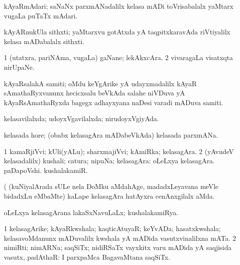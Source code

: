 \begin{center}
\bentry
{} 
\gl{\nA}
\expl{}
\bmng
kAyaRmAdari; saNaNx parxmANadalilx kelasa mADi toVrisabalalx yaMtarx \mo vugaLa puTaTx mAdari. 
\emng
\eentry

\bentry
{} 
\gl{\nA}
\expl{}
\bmng
kAyARnukUla sithxti; yaMtarxvu gotAtxda yA taqpitxkaravAda riVtiyalilx kelasa mADabalalx sithxti. 
\emng
\eentry

\bentry
{} 
\gl{\nA}
\expl{}
\bmng
\bnum
\num{1} (utatxra, pariNAma, \mo vugaLa) gaNane; lekAkxcAra. 
\num{2} vivaragaLa visatxqta nirUpaNe. 
\enum
\emng
\eentry

\bentry
{} 
\gl{\nA}
\expl{}
\bmng
kAyaRsalahA samiti; oMdu keYgArike yA udayxmadalilx kAyaR sAmathaRyxvanunx hecicxsalu beVkAda salahe niVDuva yA kAyaRsAmathaRyxda bagegx adhayxyana naDesi varadi mADuva samiti. 
\emng
\eentry

\bentry
{} 
\gl{\gu}
\expl{}
\bmng
kelasavilalxda; udoyxVgavilalxda; nirudoyxVgiyAda. 
\emng
\eentry

\bentry
{} 
\gl{\nA}
\expl{}
\bmng
kelasada hore; (obabx kelasagAra mADabeVkAda) kelasada parxmANa. 
\emng
\eentry

\bentry
{} 
\gl{\nA}
\bmng
\bnum
\num{1} kamaRjiVvi; kUli(yALu); sharxmajiVvi; kAmiRka; kelasagAra. 
\num{2} (yAvudeV kelasadalilx) kushali; catura; nipuNa; kelasagAra:  oLeLxya kelasagAra.  paDapoVshi.  kushalakamiR. 
\enum
\emng

\noindent
\gl{\pagu}
\expl{}
\bmng
{} (  (kuNiyalArada sULe nela DoMku aMdahAge, madadxLeyavana meVle bidadxLu eMbaMte) kaLape kelasagAra hatAyxra cenAnxgilalx aMda. 
\emng
\eentry

\bentry
{} 
\gl{\gu}
\expl{}
\bmng
oLeLxya kelasagArana lakaSxNavuLaLx; kushalakamiRya. 
\emng
\eentry

\bentry
{} 
\gl{\nA}
\expl{}
\bmng
\bnum
\num{1} kelasagArike; kAyaRkwshala; kaqticAtuyaR; keYvADa; hasatxkwshala; kelasavoMdanunx mADuvalilx kwshala yA mADida vasutxvinalilxna mATa. 
\num{2} nimiRti; nimARNa; saqSiTx; nidiRSaTx vayxkitx \mo varu mADida yA saqjisida vasutx, padAthaR:  I parxpaMca BagavaMtana saqSiTx. 
\enum
\emng
\eentry


\end{center}
